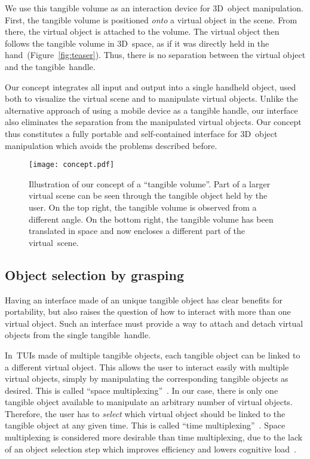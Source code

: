 \documentclass{vgtc}                         \havecopyrightspacefalse
\begin{document}
We use this tangible volume as an interaction device for \mbox{3D~object} manipulation. First, the tangible volume is positioned \emph{onto} a virtual object in the scene. From there, the virtual object is attached to the volume. The virtual object then follows the tangible volume in 3D~space, as if it was directly held in the hand~(Figure~\ref{fig:teaser}). Thus, there is no separation between the virtual object and the tangible~handle.

Our concept integrates all input and output into a single handheld object, used both to visualize the virtual scene and to manipulate virtual objects. Unlike the alternative approach of using a mobile device as a tangible handle, our interface also eliminates the separation from the manipulated virtual objects. Our concept thus constitutes a fully portable and self-contained interface for 3D~object manipulation which avoids the problems described before.

\begin{figure}[t]
  \centering
  \texttt{[image: concept.pdf]}
  \caption{Illustration of our concept of a ``tangible volume''. Part of a larger virtual scene can be seen through the tangible object held by the user. On the top right, the tangible volume is observed from a different angle. On the bottom right, the tangible volume has been translated in space and now encloses a different part of the virtual~scene.}
  \label{fig:concept}
\end{figure}

\subsection{Object selection by grasping}

Having an interface made of an unique tangible object has clear \mbox{benefits} for portability, but also raises the question of how to interact with more than one virtual object. Such an interface must provide a way to attach and detach virtual objects from the single tangible~handle.

In~TUIs made of multiple tangible objects, each tangible object can be linked to a different virtual object. This allows the user to interact easily with multiple virtual objects, simply by manipulating the corresponding tangible objects as desired. This is called ``space multiplexing''~\cite{fitzmaurice96}. In our case, there is only one tangible object available to manipulate an arbitrary number of virtual objects. Therefore, the user has to \emph{select} which virtual object should be linked to the tangible object at any given time. This is called ``time multiplexing''~\cite{fitzmaurice96}. Space multiplexing is considered more desirable than time multiplexing, due to the lack of an object selection step which improves efficiency and lowers cognitive load~\cite{fitzmaurice96}.
\end{document}

